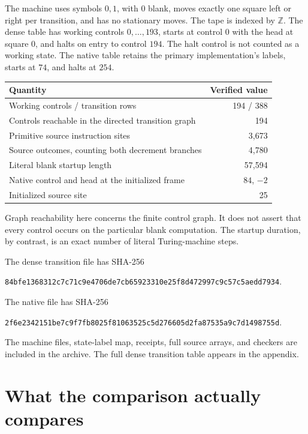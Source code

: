\documentclass[11pt]{article}
\begin{document}
The machine uses symbols $0,1$, with $0$ blank, moves exactly one square left
or right per transition, and has no stationary moves. The tape is indexed by
$\mathbb Z$. The dense table has working controls $0,\ldots,193$, starts at
control $0$ with the head at square $0$, and halts on entry to control $194$.
The halt control is not counted as a working state. The native table retains
the primary implementation's labels, starts at $74$, and halts at $254$.

\begin{center}
\begin{tabular}{@{}lr@{}}
\toprule
Quantity & Verified value\\\midrule
Working controls / transition rows & 194 / 388\\
Controls reachable in the directed transition graph & 194\\
Primitive source instruction sites & 3,673\\
Source outcomes, counting both decrement branches & 4,780\\
Literal blank startup length & 57,594\\
Native control and head at the initialized frame & $84$, $-2$\\
Initialized source site & 25\\
\bottomrule
\end{tabular}
\end{center}
Graph reachability here concerns the finite control graph. It does not assert
that every control occurs on the particular blank computation. The startup
duration, by contrast, is an exact number of literal Turing-machine steps.

The dense transition file has SHA-256
\begin{center}\scriptsize\texttt{84bfe1368312c7c71c9e4706de7cb65923310e25f8d472997c9c57c5aedd7934}.\end{center}
The native file has SHA-256
\begin{center}\scriptsize\texttt{2f6e2342151be7c9f7fb8025f81063525c5d276605d2fa87535a9c7d1498755d}.\end{center}
The machine files, state-label map, receipts, full source arrays, and checkers
are included in the archive. The full dense transition table appears in the
appendix.

\section{What the comparison actually compares}
\end{document}
